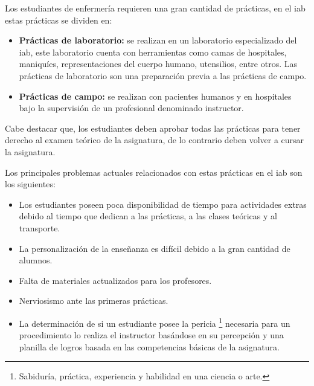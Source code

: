 Los estudiantes de enfermería requieren una gran cantidad de prácticas, en el
\Gls{iab} estas prácticas se dividen en:
\begin{itemize}
\item \textbf{Prácticas de laboratorio:} se realizan en un laboratorio
    especializado del \Gls{iab}, este laboratorio cuenta con herramientas como
    camas de hospitales, maniquíes, representaciones del cuerpo humano,
    utensilios, entre otros. Las prácticas de laboratorio son una
    preparación previa a las prácticas de campo.
\item \textbf{Prácticas de campo:} se realizan con pacientes humanos y en
    hospitales bajo la supervisión de un profesional denominado instructor. 
\end{itemize}

Cabe destacar que, los estudiantes deben aprobar todas las prácticas para tener 
derecho al examen teórico de la asignatura, de lo contrario deben volver a cursar la 
asignatura.

Los principales problemas actuales relacionados con estas prácticas en el \Gls{iab}
son los siguientes:

\begin{itemize}
\item Los estudiantes poseen poca disponibilidad de tiempo para actividades
    extras debido al tiempo que dedican a las prácticas, a las clases teóricas y
    al transporte\cite{iab:tesis_alumnos}.
\item La personalización de la enseñanza es difícil debido a la gran cantidad de
    alumnos\cite{iab:tesis_alumnos}.
\item Falta de materiales actualizados para los
    profesores\cite{iab:tesis_alumnos}.
\item Nerviosismo ante las primeras prácticas.
\item La determinación de si un estudiante posee la pericia \footnote{Sabiduría,
        práctica, experiencia y habilidad en una ciencia o arte.} necesaria para
    un procedimiento lo realiza el instructor basándose en su percepción y una
    planilla de logros basada en las competencias básicas de la asignatura.
\end{itemize}

